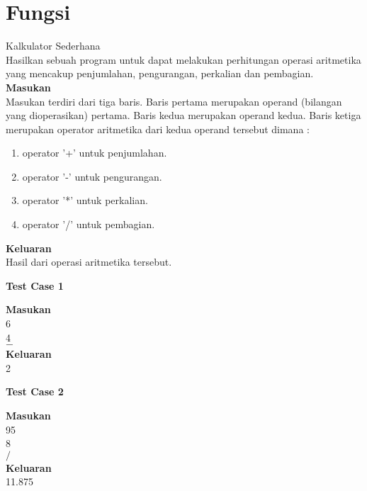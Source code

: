\chapter{Fungsi}

\begin{permasalahan}{Kalkulator Sederhana}\\
	Hasilkan sebuah program untuk dapat melakukan perhitungan operasi aritmetika yang mencakup penjumlahan, pengurangan, perkalian dan pembagian.\\
	\textbf{Masukan}\\
	Masukan terdiri dari tiga baris. Baris pertama merupakan operand (bilangan yang dioperasikan) pertama. Baris kedua merupakan operand kedua. Baris ketiga merupakan operator aritmetika dari kedua operand tersebut dimana :
	\begin{enumerate}
		\item operator '+' untuk penjumlahan.
		\item operator '-' untuk pengurangan.
		\item operator '*' untuk perkalian.
		\item operator '/' untuk pembagian.
	\end{enumerate}
	\textbf{Keluaran}\\
	Hasil dari operasi aritmetika tersebut.\\
	\begin{center}
	\textbf{Test Case 1}\\
	\end{center}
	\textbf{Masukan}\\
	6\\
	4\\
	$-$\\
	\textbf{Keluaran}\\
	2\\
	\begin{center}
	\textbf{Test Case 2}\\
	\end{center}
	\textbf{Masukan}\\
	95\\
	8\\
	$/$\\
	\textbf{Keluaran}\\
	11.875\\
\end{permasalahan}

